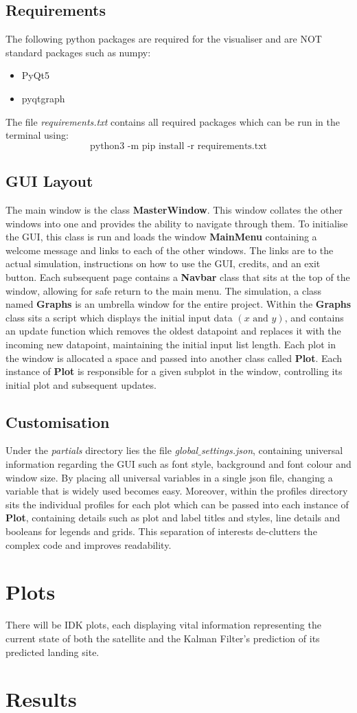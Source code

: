 \documentclass[12pt, a4paper]{article}
\begin{document}
\subsection{Requirements}
The following python packages are required for the visualiser and are NOT standard packages such as numpy:
\begin{itemize}
\item PyQt5
\item pyqtgraph
\end{itemize}
The file \textit{requirements.txt} contains all required packages which can be run in the terminal using:
\begin{equation}
\text{python3 -m pip install -r requirements.txt}
\end{equation}

\subsection{GUI Layout}
The main window is the class \textbf{MasterWindow}. This window collates the other windows into one and provides the ability to navigate through them. To initialise the GUI, this class is run and loads the window \textbf{MainMenu} containing a welcome message and links to each of the other windows. The links are to the actual simulation, instructions on how to use the GUI, credits, and an exit button. Each subsequent page contains a \textbf{Navbar} class that sits at the top of the window, allowing for safe return to the main menu. The simulation, a class named \textbf{Graphs} is an umbrella window for the entire project. Within the \textbf{Graphs} class sits a script which displays the initial input data $(x \text{ and } y)$, and contains an update function which removes the oldest datapoint and replaces it with the incoming new datapoint, maintaining the initial input list length. Each plot in the window is allocated a space and passed into another class called \textbf{Plot}. Each instance of \textbf{Plot} is responsible for a given subplot in the window, controlling its initial plot and subsequent updates.

\subsection{Customisation}
Under the \textit{partials} directory lies the file \textit{global$\_$settings.json}, containing universal information regarding the GUI such as font style, background and font colour and window size. By placing all universal variables in a single json file, changing a variable that is widely used becomes easy. Moreover, within the profiles directory sits the individual profiles for each plot which can be passed into each instance of \textbf{Plot}, containing details such as plot and label titles and styles, line details and booleans for legends and grids. This separation of interests de-clutters the complex code and improves readability.

\section{Plots}
There will be IDK plots, each displaying vital information representing the current state of both the satellite and the Kalman Filter's prediction of its predicted landing site. 

\section{Results}
\end{document}
